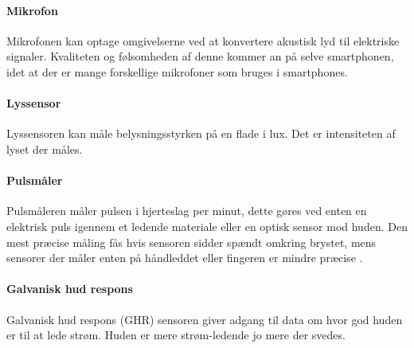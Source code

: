 \paragraph{Mikrofon}
Mikrofonen kan optage omgivelserne ved at konvertere akustisk lyd til elektriske signaler. Kvaliteten og følsomheden af denne kommer an på selve smartphonen, idet at der er mange forskellige mikrofoner som bruges i smartphones. 

\paragraph{Lyssensor}
Lyssensoren kan måle belysningsstyrken på en flade i lux. Det er intensiteten af lyset der måles.

\paragraph{Pulsmåler}
Pulsmåleren måler pulsen i hjerteslag per minut, dette gøres ved enten en elektrisk puls igennem et ledende materiale eller en optisk sensor mod huden.
Den mest præcise måling fås hvis sensoren sidder spændt omkring brystet, mens sensorer der måler enten på håndleddet eller fingeren er mindre præcise \citep{burke1998precision}.

\paragraph{Galvanisk hud respons}
Galvanisk hud respons (GHR) sensoren giver adgang til data om hvor god huden er til at lede strøm.
Huden er mere strøm-ledende jo mere der svedes.
